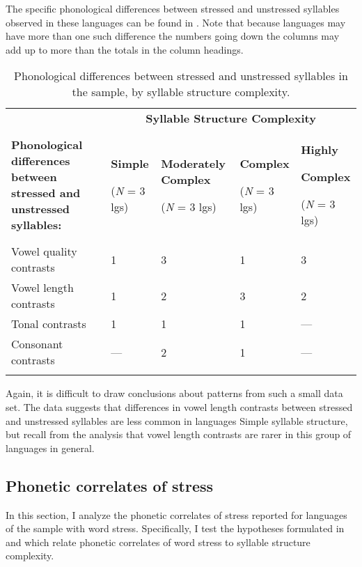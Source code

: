  The specific phonological differences between stressed and unstressed syllables observed in these languages can be found in . Note that because languages may have more than one such difference the numbers going down the columns may add up to more than the totals in the column headings.

\begin{table}
\begin{tabularx}{\textwidth}{XXXXX}
\lsptoprule
 & \multicolumn{4}{c}{ \textbf{Syllable Structure Complexity}}\\
 \textbf{Phonological differences between stressed and unstressed syllables:} & { \textbf{Simple}}

 (\textit{N} = 3 lgs) & { \textbf{Moderately Complex}}

 (\textit{N} = 3 lgs) & { \textbf{Complex}}

 (\textit{N} = 3 lgs) & { \textbf{Highly} }

{ \textbf{Complex}}

 (\textit{N} = 3 lgs)\\
 Vowel quality contrasts & 1 & 3 & 1 & 3\\
 Vowel length contrasts & 1 & 2 & 3 & 2\\
 Tonal contrasts & 1 & 1 & 1 & —\\
 Consonant contrasts & — & 2 & 1 & —\\
\lspbottomrule
\end{tabularx}
\caption{\label{tab:5.12}Phonological differences between stressed and unstressed syllables in the sample, by syllable structure complexity.}
\end{table}

  Again, it is difficult to draw conclusions about patterns from such a small data set. The data suggests that differences in vowel length contrasts between stressed and unstressed syllables are less common in languages Simple syllable structure, but recall from the analysis  that vowel length contrasts are rarer in this group of languages in general.

\subsection{Phonetic correlates of stress}\label{sec:5.4.5}

  In this section, I analyze the phonetic correlates of stress reported for languages of the sample with word stress. Specifically, I test the hypotheses formulated in  and  which relate phonetic correlates of word stress to syllable structure complexity.

